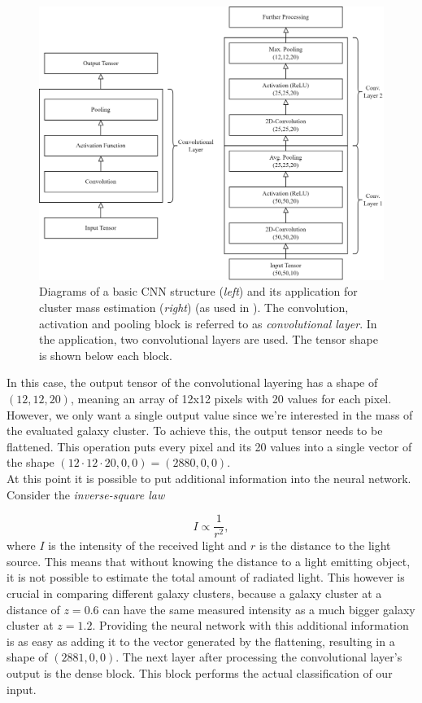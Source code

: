\begin{figure}[h]
\centering
\includegraphics[width=\textwidth]{images/Chapter2/basic_cnn.png}
\caption{Diagrams of a basic CNN structure (\textit{left}) and its application for cluster mass estimation (\textit{right}) (as used in \citealp{Krippendorf_2023}). The convolution, activation and pooling block is referred to as \textit{convolutional layer}. In the application, two convolutional layers are used. The tensor shape is shown below each block.} 
\label{fig:CNN_Blocks}
\end{figure}


In this case, the output tensor of the convolutional layering has a shape of $(12,12,20)$, meaning an array of 12x12 pixels with 20 values for each pixel. However, we only want a single output value since we're interested in the mass of the evaluated galaxy cluster. To achieve this, the output tensor needs to be flattened. This operation puts every pixel and its 20 values into a single vector of the shape $(12\cdot 12 \cdot 20,0,0) = (2880,0,0)$. \\

At this point it is possible to put additional information into the neural network. Consider the \textit{inverse-square law}

\begin{equation}
    I \propto \frac{1}{r^2},
\end{equation}
where $I$ is the intensity of the received light and $r$ is the distance to the light source. This means that without knowing the distance to a light emitting object, it is not possible to estimate the total amount of radiated light. This however is crucial in comparing different galaxy clusters, because a galaxy cluster at a distance of $z=0.6$ can have the same measured intensity as a much bigger galaxy cluster at $z=1.2$.
Providing the neural network with this additional information is as easy as adding it to the vector generated by the flattening, resulting in a shape of $(2881,0,0)$. The next layer after processing the convolutional layer's output is the dense block. This block performs the actual classification of our input. 

